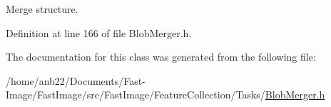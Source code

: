 Merge structure. 



Definition at line 166 of file Blob\+Merger.\+h.



The documentation for this class was generated from the following file\+:\begin{DoxyCompactItemize}
\item 
/home/anb22/\+Documents/\+Fast-\/\+Image/\+Fast\+Image/src/\+Fast\+Image/\+Feature\+Collection/\+Tasks/\hyperlink{BlobMerger_8h}{Blob\+Merger.\+h}\end{DoxyCompactItemize}
